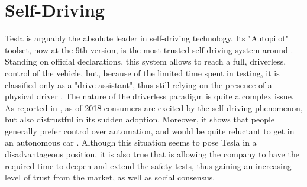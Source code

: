 \section{Self-Driving}

Tesla is arguably the absolute leader in self-driving technology. Its "Autopilot" toolset, now at the 9th version, is the most trusted self-driving system around \cite{tesla_trust}. Standing on official declarations, this system allows to reach a full, driverless, control of the vehicle, but, because of the limited time spent in testing, it is classified only as a "drive assistant", thus still relying on the presence of a physical driver \cite{tesla_full_self-driving}.
The nature of the driverless paradigm is quite a complex issue. As reported in \cite{tesla_awareness}, as of 2018 consumers are excited by the self-driving phenomenon, but also distrustful in its sudden adoption. Moreover, it shows that people generally prefer control over automation, and would be quite reluctant to get in an autonomous car \cite{tesla_awareness}. Although this situation seems to pose Tesla in a disadvantageous position, it is also true that is allowing the company to have the required time to deepen and extend the safety tests, thus gaining an increasing level of trust from the market, as well as social consensus.
